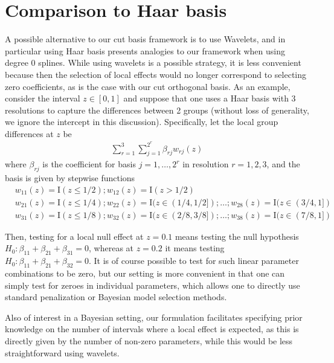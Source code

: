 \section{Comparison to Haar basis}
\label{supplsec:haar_basis}



A possible alternative to our cut basis framework is to use Wavelets, and in particular using Haar basis presents analogies to our framework when using degree 0 splines. 
While using wavelets is a possible strategy, it is less convenient because then the selection of local effects would no longer correspond to selecting zero coefficients, as is the case with our cut orthogonal basis. 
As an example, consider the interval $z \in [0,1]$ and suppose that one uses a Haar basis with 3 resolutions to capture the differences between 2 groups (without loss of generality, we ignore the intercept in this discussion). Specifically, let the local group differences at $z$ be
\begin{align}
\sum_{r=1}^3 \sum_{j=1}^{2^r} \beta_{rj} w_{rj}(z)
\nonumber
\end{align}
where $\beta_{rj}$ is the coefficient for basis $j=1,\ldots,2^r$ in resolution $r=1,2,3$, and the basis is given by stepwise functions
\begin{align}
&w_{11}(z)= \mbox{I}(z \leq 1/2); w_{12}(z)= \mbox{I}(z > 1/2)
\nonumber \\
&w_{21}(z)= \mbox{I}(z \leq 1/4); w_{22}(z)= \mbox{I}(z \in (1/4,1/2]); \ldots; w_{28}(z)= \mbox{I}(z \in (3/4,1])
\nonumber \\
&w_{31}(z)= \mbox{I}(z \leq 1/8); w_{32}(z)= \mbox{I}(z \in (2/8,3/8]); \ldots; w_{38}(z)= \mbox{I}(z \in (7/8,1])
\nonumber
\end{align}

Then, testing for a local null effect at $z=0.1$ means testing the null hypothesis $H_0: \beta_{11} + \beta_{21} + \beta_{31}= 0$, 
whereas at $z=0.2$ it means testing $H_0: \beta_{11} + \beta_{21} + \beta_{32}= 0$.
It is of course possible to test for such linear parameter combinations to be zero, but our setting is more convenient in that one can simply test for zeroes in individual parameters, which allows one to directly use standard penalization or Bayesian model selection methods.

Also of interest in a Bayesian setting, our formulation facilitates specifying prior knowledge on the number of intervals where a local effect is expected, as this is directly given by the number of non-zero parameters, while this would be less straightforward using wavelets.



